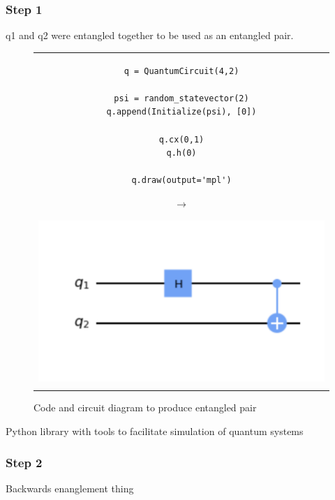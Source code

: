 \subsubsection{Step 1}
q1 and q2 were entangled together to be used as an entangled pair.
\begin{figure}[h]
\centering
\begin{tabular}{c}
\begin{minipage}[c]{.45\linewidth}
\begin{verbatim}
q = QuantumCircuit(4,2)

psi = random_statevector(2)
q.append(Initialize(psi), [0])

q.cx(0,1)
q.h(0)

q.draw(output='mpl')
\end{verbatim}
\end{minipage}
\begin{minipage}[c]{.1\linewidth}
\centering
$\rightarrow$
\end{minipage}
\begin{minipage}[c]{.4\linewidth}
\centering
\includegraphics[width=\textwidth]{lab3/images/Step1.png}
\end{minipage}\\
\\ %
\end{tabular}
\caption{Code and circuit diagram to produce entangled pair}
\label{step1}
\end{figure}

Python library with tools to facilitate simulation of quantum systems

\subsubsection{Step 2}
Backwards enanglement thing

